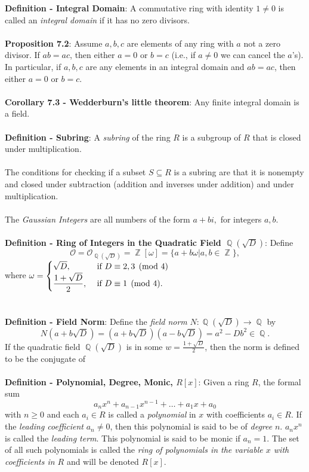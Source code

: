 \documentclass{article}
\DeclareMathOperator{\Z}{\mathbb{Z}}
\DeclareMathOperator{\Q}{\mathbb{Q}}
\begin{document}
\textbf{Definition - Integral Domain}: A commutative ring with identity $1 \neq 0$ is called an \textit{integral domain} if it has no zero divisors. \\ \\
\textbf{Proposition 7.2}: Assume $a, b, c$ are elements of any ring with $a$ not a zero divisor. If $ab = ac$, then either $a = 0$ or $b = c$ (i.e., if $a \neq 0$ we can cancel the $a$'s). In particular, if $a, b, c$ are any elements in an integral domain and $ab = ac$, then either $a = 0$ or $b = c$. \\ \\
\textbf{Corollary 7.3 - Wedderburn's little theorem}: Any finite integral domain is a field. \\ \\
\textbf{Definition - Subring}: A \textit{subring} of the ring $R$ is a subgroup of $R$ that is closed under multiplication. \\ \\
The conditions for checking if a subset $S \subseteq R$ is a subring are that it is nonempty and closed under subtraction (addition and inverses under addition) and under multiplication. \\ \\
The \textit{Gaussian Integers} are all numbers of the form $a + bi,$ for integers $a, b.$ \\ \\
\textbf{Definition - Ring of Integers in the Quadratic Field $\Q(\sqrt{D})$}: Define $$\mathcal{O} = \mathcal{O}_{\Q(\sqrt{D})} = \Z[\omega] = \{a + b \omega | a, b \in \Z\},$$ where $\omega = \begin{cases}
    \sqrt{D}, &\text{ if } D \equiv 2, 3 \pmod{4} \\
    \mathlarger{\frac{1 + \sqrt{D}}{2}}, &\text{ if } D \equiv 1 \pmod{4}. \\
\end{cases}$ \\ \\ \\
\textbf{Definition - Field Norm}: Define the \textit{field norm} $N: \Q(\sqrt{D}) \rightarrow \Q$ by $$N(a + b\sqrt{D}) = (a + b\sqrt{D})(a - b\sqrt{D}) = a^2 - Db^2 \in \Q.$$ If the quadratic field $\Q(\sqrt{D})$ is in some $w = \frac{1 + \sqrt{D}}{2}$, then the norm is defined to be the conjugate of  \\ \\
\textbf{Definition - Polynomial, Degree, Monic, $R[x]$}: Given a ring $R$, the formal sum $$a_nx^n + a_{n - 1}x^{n - 1} + \dots + a_1x + a_0$$ with $n \geq 0$ and each $a_i \in R$ is called a \textit{polynomial} in $x$ with coefficients $a_i \in R$. If the \textit{leading coefficient} $a_n \neq 0$, then this polynomial is said to be of \textit{degree} $n$. $a_nx^n$ is called the \textit{leading term}. This polynomial is said to be monic if $a_n = 1$. The set of all such polynomials is called the \textit{ring of polynomials in the variable $x$ with coefficients in $R$} and will be denoted $R[x]$. \\ \\
\end{document}
